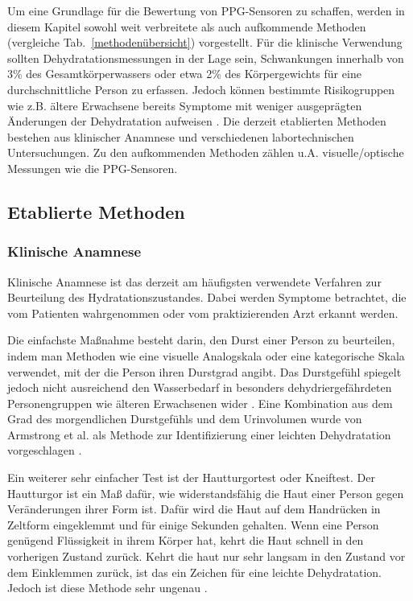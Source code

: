 \documentclass[10pt,a4paper,headinclude,twoside, plainheadsepline, open=right, numbers=noenddot, twocolumn]{article}
\begin{document}
Um eine Grundlage für die Bewertung von PPG-Sensoren zu schaffen, werden in diesem Kapitel sowohl weit verbreitete als auch aufkommende Methoden (vergleiche Tab.~\ref{methodenübersicht}) vorgestellt.
Für die klinische Verwendung sollten Dehydratationsmessungen in der Lage sein, Schwankungen innerhalb von 3\% des Gesamtkörperwassers oder etwa
2\% des Körpergewichts für eine durchschnittliche Person zu erfassen.
Jedoch können bestimmte Risikogruppen wie z.B. ältere Erwachsene bereits Symptome mit weniger ausgeprägten Änderungen der Dehydratation aufweisen \cite{garret2018engineering}.
Die derzeit etablierten Methoden bestehen aus klinischer Anamnese und verschiedenen labortechnischen Untersuchungen.
Zu den aufkommenden Methoden zählen u.A. visuelle/optische Messungen wie die PPG-Sensoren.

\subsection{Etablierte Methoden}
\label{etablierte methoden}

\subsubsection{Klinische Anamnese}
\label{klinische anamnese}

Klinische Anamnese ist das derzeit am häufigsten verwendete Verfahren zur Beurteilung des Hydratationszustandes.
Dabei werden Symptome betrachtet, die vom Patienten wahrgenommen oder vom praktizierenden Arzt erkannt werden.
 
Die einfachste Maßnahme besteht darin, den Durst einer Person zu beurteilen, indem man Methoden wie eine visuelle Analogskala oder eine kategorische Skala verwendet, mit der die Person ihren Durstgrad angibt.
Das Durstgefühl spiegelt jedoch nicht ausreichend den Wasserbedarf in besonders dehydriergefährdeten Personengruppen wie älteren Erwachsenen wider \cite{garret2018engineering}.
Eine Kombination aus dem Grad des morgendlichen Durstgefühls und dem Urinvolumen wurde von Armstrong et al. als Methode zur Identifizierung einer leichten Dehydratation vorgeschlagen \cite{armstrong2013novel}.

Ein weiterer sehr einfacher Test ist der Hautturgortest oder Kneiftest. 
Der Hautturgor ist ein Maß dafür, wie widerstandsfähig die Haut einer Person gegen Veränderungen ihrer Form ist.
Dafür wird die Haut auf dem Handrücken in Zeltform eingeklemmt und für einige Sekunden gehalten.
Wenn eine Person genügend Flüssigkeit in ihrem Körper hat, kehrt die Haut schnell in den vorherigen Zustand zurück.
Kehrt die haut nur sehr langsam in den Zustand vor dem Einklemmen zurück, ist das ein Zeichen für eine leichte Dehydratation.
Jedoch ist diese Methode sehr ungenau \cite{suryadevara2015towards}.
\end{document}
